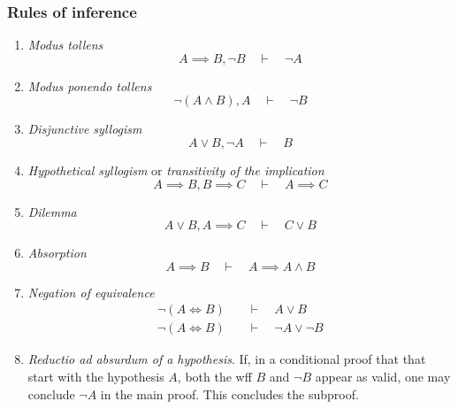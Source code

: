 \subsubsection{Rules of inference}
\begin{enumerate}
\item \textit{Modus tollens}\[ A\implies B, \neg B \quad\vdash\quad \neg A \]
\item \textit{Modus ponendo tollens}\[ \neg(A\land B), A \quad\vdash\quad \neg B \]
\item \textit{Disjunctive syllogism} \[ A\lor B, \neg A \quad\vdash\quad B \]
\item \textit{Hypothetical syllogism} or \textit{transitivity of the implication}
\[ A \implies B, B \implies C \quad\vdash\quad A \implies C \]
\item \textit{Dilemma} \[ A\lor B, A \implies C \quad\vdash\quad C\lor B \]
\item \textit{Absorption} \[ A\implies B \quad\vdash\quad A \implies A\land B \]
\item \textit{Negation of equivalence}
\begin{align*}
\neg (A\iff B) \quad&\vdash\quad A\lor B \\
\neg (A\iff B) \quad&\vdash\quad \neg A\lor \neg B
\end{align*}
\item \textit{Reductio ad absurdum of a hypothesis}. If, in a conditional proof that that start with the hypothesis $A$, both the wff $B$ and $\neg B$ appear as valid, one may conclude $\neg A$ in the main proof. This concludes the subproof.
\end{enumerate}
